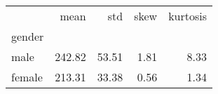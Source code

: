\begin{tabular}{lrrrr}
\toprule
{} &    mean &    std &  skew &  kurtosis \\
gender &         &        &       &           \\
\midrule
male   &  242.82 &  53.51 &  1.81 &      8.33 \\
female &  213.31 &  33.38 &  0.56 &      1.34 \\
\bottomrule
\end{tabular}
